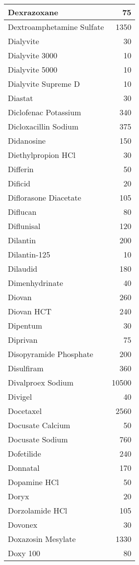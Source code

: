 \documentclass[
]{article}
\begin{document}
\begin{table}
\begin{tabular}[t]{l|r}
Dexrazoxane & 75\\
\hline
Dextroamphetamine Sulfate & 1350\\
\hline
Dialyvite & 30\\
\hline
Dialyvite 3000 & 10\\
\hline
Dialyvite 5000 & 10\\
\hline
Dialyvite Supreme D & 10\\
\hline
Diastat & 30\\
\hline
Diclofenac Potassium & 340\\
\hline
Dicloxacillin Sodium & 375\\
\hline
Didanosine & 150\\
\hline
Diethylpropion HCl & 30\\
\hline
Differin & 50\\
\hline
Dificid & 20\\
\hline
Diflorasone Diacetate & 105\\
\hline
Diflucan & 80\\
\hline
Diflunisal & 120\\
\hline
Dilantin & 200\\
\hline
Dilantin-125 & 10\\
\hline
Dilaudid & 180\\
\hline
Dimenhydrinate & 40\\
\hline
Diovan & 260\\
\hline
Diovan HCT & 240\\
\hline
Dipentum & 30\\
\hline
Diprivan & 75\\
\hline
Disopyramide Phosphate & 200\\
\hline
Disulfiram & 360\\
\hline
Divalproex Sodium & 10500\\
\hline
Divigel & 40\\
\hline
Docetaxel & 2560\\
\hline
Docusate Calcium & 50\\
\hline
Docusate Sodium & 760\\
\hline
Dofetilide & 240\\
\hline
Donnatal & 170\\
\hline
Dopamine HCl & 50\\
\hline
Doryx & 20\\
\hline
Dorzolamide HCl & 105\\
\hline
Dovonex & 30\\
\hline
Doxazosin Mesylate & 1330\\
\hline
Doxy 100 & 80\\

\end{tabular}
\end{table}
\end{document}
